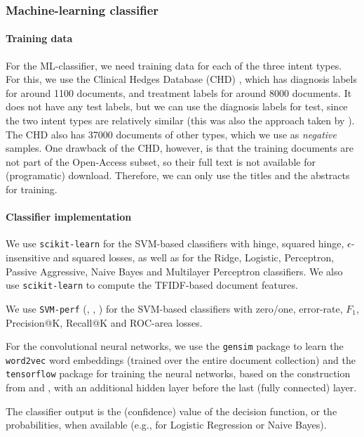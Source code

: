 \subsubsection{Machine-learning classifier}

\paragraph{Training data}
For the ML-classifier, we need training data for each of the three intent types. For this, we use the Clinical Hedges Database (CHD)
\cite{chd},
which has diagnosis labels for around 1100 documents, and treatment labels for around 8000 documents. It does
not have any test labels, but we can use the diagnosis labels for test, since the two intent types are relatively similar
(this was also the approach taken by \cite{choi}).
The CHD also has 37000 documents of other types, which we use as \emph{negative} samples.
One drawback of the CHD, however, is that the training documents are not part of the Open-Access subset, so their full text is not
available for (programatic) download. Therefore, we can only use the titles and the abstracts for training.

\paragraph{Classifier implementation}
We use \texttt{scikit-learn} \cite{scikit} for the SVM-based classifiers with hinge,
squared hinge, $\epsilon$-insensitive and squared losses, as well as for the Ridge, Logistic, Perceptron,
Passive Aggressive, Naive Bayes and Multilayer Perceptron classifiers.
We also use \texttt{scikit-learn} to compute the TFIDF-based document features.

We use \texttt{SVM-perf} (\cite{svmperf3}, \cite{svmperf1}, \cite{svmperf2})
for the SVM-based classifiers with zero/one, error-rate, $F_1$, Precision@K, Recall@K and ROC-area losses.

For the convolutional neural networks, we use the \texttt{gensim} package \cite{gensim} to learn the \texttt{word2vec}
word embeddings (trained over the entire document collection)
and the \texttt{tensorflow} package \cite{tf} for training the neural networks, based on the construction
from \cite{cnn} and \cite{cnn-code}, with an additional hidden layer before the last (fully connected) layer.

The classifier output is the (confidence) value of the decision function, or the probabilities, when available (e.g.,
for Logistic Regression or Naive Bayes).

